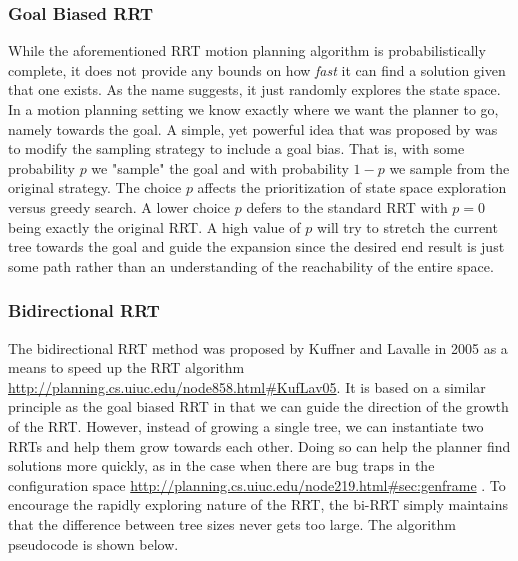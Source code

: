 \subsubsection{Goal Biased RRT} \label{planning:goal-bias}
While the aforementioned RRT motion planning algorithm is probabilistically complete, it does not provide any bounds on how \emph{fast} it can find a solution given that one exists. As the name suggests, it just randomly explores the state space. In a motion planning setting we know exactly where we want the planner to go, namely towards the goal. A simple, yet powerful idea that was proposed by  was to modify the sampling strategy to include a goal bias. That is, with some probability $p$ we "sample" the goal and with probability $1-p$ we sample from the original strategy. The choice $p$ affects the prioritization of state space exploration versus greedy search. A lower choice $p$ defers to the standard RRT with $p=0$ being exactly the original RRT. A high value of $p$ will try to stretch the current tree towards the goal and guide the expansion since the desired end result is just some path rather than an understanding of the reachability of the entire space.

\subsubsection{Bidirectional RRT} \label{planning:birrt}
The bidirectional RRT method was proposed by  Kuffner and Lavalle in 2005 as a means to speed up the RRT algorithm \url{http://planning.cs.uiuc.edu/node858.html#KufLav05}. It is based on a similar principle as the goal biased RRT in that we can guide the direction of the growth of the RRT. However, instead of growing a single tree, we can instantiate two RRTs and help them grow towards each other. Doing so can help the planner find solutions more quickly, as in the case when there are bug traps in the configuration space \url{http://planning.cs.uiuc.edu/node219.html#sec:genframe} . To encourage the rapidly exploring nature of the RRT, the bi-RRT simply maintains that the difference between tree sizes never gets too large. The algorithm pseudocode is shown below.

